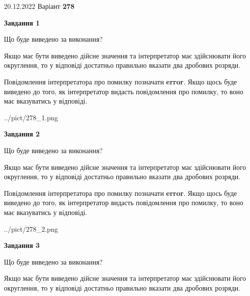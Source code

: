 \documentclass[12pt, ukrainian]{article}
\begin{document}
{20.12.2022 Варіант \No \textbf { 278 }\par}
{
\begin {Large}

{\begin {center}\textbf{Завдання 1}\end {center}}\par
Що буде виведено за виконання? \par

Якщо має бути виведено дійсне значення та інтерпретатор має здійснювати його округлення, 
то у відповіді достатньо правильно вказати два дробових розряди.

Повідомлення інтерпретатора про помилку позначати \textbf{error}.
Якщо щось буде виведено до того, як інтерпретатор видасть повідомлення про помилку, 
то воно має вказуватись у відповіді. \par

\begin{center}
	{../pict/278_1.png}
\end{center}
\newpage

{\begin {center}\textbf{Завдання 2}\end {center}}\par
Що буде виведено за виконання? \par

Якщо має бути виведено дійсне значення та інтерпретатор має здійснювати його округлення, 
то у відповіді достатньо правильно вказати два дробових розряди.

Повідомлення інтерпретатора про помилку позначати \textbf{error}.
Якщо щось буде виведено до того, як інтерпретатор видасть повідомлення про помилку, 
то воно має вказуватись у відповіді. \par

\begin{center}
	{../pict/278_2.png}
\end{center}
\newpage

{\begin {center}\textbf{Завдання 3}\end {center}}\par
Що буде виведено за виконання? \par

Якщо має бути виведено дійсне значення та інтерпретатор має здійснювати його округлення, 
то у відповіді достатньо правильно вказати два дробових розряди.


\end{Large}}
\end{document}

